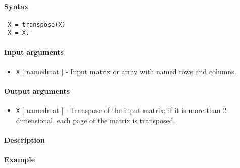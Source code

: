 


	\paragraph{Syntax}
 
 \begin{verbatim}
 X = transpose(X)
 X = X.'
 \end{verbatim}
 
 \paragraph{Input arguments}
 
 \begin{itemize}
 \item
   \texttt{X} {[} namedmat {]} - Input matrix or array with named rows
   and columns.
 \end{itemize}
 
 \paragraph{Output arguments}
 
 \begin{itemize}
 \item
   \texttt{X} {[} namedmat {]} - Transpose of the input matrix; if it is
   more than 2-dimensional, each page of the matrix is transposed.
 \end{itemize}
 
 \paragraph{Description}
 
 \paragraph{Example}


